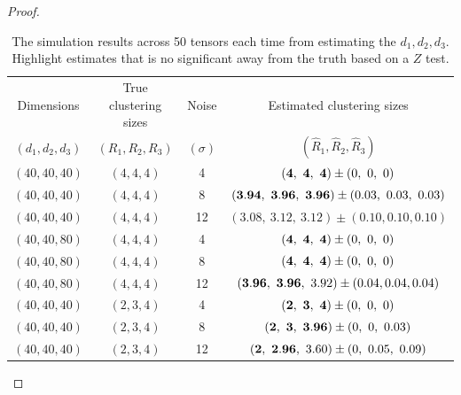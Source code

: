 \documentclass{article}
\newtheorem{proof}{Proof}
\begin{document}
\begin{appendices}
\begin{proof}
\begin{table}[http]
	\centering
	\begin{tabular}{c|c|c|c}
		\hline
		Dimensions &True clustering sizes&Noise&Estimated clustering sizes\\ 
$(d_1,d_2,d_3)$&$(R_1,R_2,R_3)$&$(\sigma)$&$(\hat R_1,\hat R_2,\hat R_3)$\\
		\hline
		$(40,40,40)$&$(4,4,4)$&4&$({\bf 4},\ {\bf 4},\ {\bf 4})\pm (0,\ 0,\ 0)$\\
		$(40,40,40)$&$(4,4,4)$&8&$({\bf 3.94},\ {\bf 3.96},\ {\bf 3.96})\pm (0.03,\ 0.03,\ 0.03)$\\
		$(40,40,40)$&$(4,4,4)$&12&$(3.08,\ 3.12,\ 3.12)\pm (0.10,0.10,0.10)$\\
		\hline
		$(40,40,80)$&$(4,4,4)$&4&$({\bf 4},\ {\bf 4},\ {\bf 4})\pm (0,\ 0,\ 0)$\\
		$(40,40,80)$&$(4,4,4)$&8&$({\bf 4},\ {\bf 4},\ {\bf 4})\pm (0,\ 0,\ 0)$\\
		$(40,40,80)$&$(4,4,4)$&12&$({\bf 3.96},\ {\bf 3.96},\ 3.92)\pm (0.04,0.04,0.04)$\\
			\hline
		$(40,40,40)$&$(2,3,4)$&4&$({\bf 2},\ {\bf 3},\ {\bf 4})\pm (0,\ 0,\ 0)$\\
		$(40,40,40)$&$(2,3,4)$&8&$({\bf 2},{\bf \ 3},\ {\bf 3.96})\pm (0,\ 0,\ 0.03)$ \\
		$(40,40,40)$&$(2,3,4)$&12&$({\bf 2},\ {\bf 2.96},\ 3.60)\pm (0,\ 0.05,\ 0.09)$
	\end{tabular}
	\caption{The simulation results across 50 tensors each time from estimating the $d_1,d_2,d_3$. Highlight estimates that is no significant away from the truth based on a $Z$ test.}\label{tab:rank}
\end{table}



\end{proof}
\end{appendices}
\end{document}
